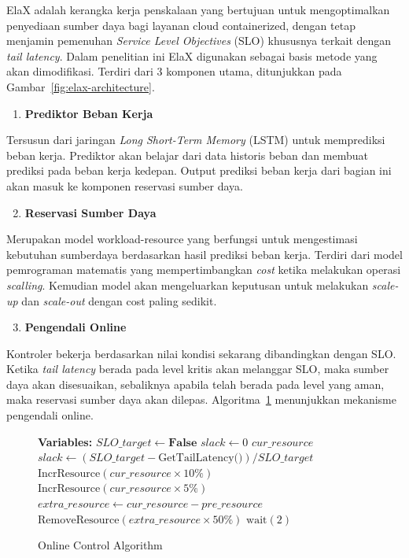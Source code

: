 ElaX adalah kerangka kerja penskalaan yang bertujuan untuk mengoptimalkan penyediaan sumber daya bagi layanan cloud containerized, dengan tetap menjamin pemenuhan \emph{Service Level Objectives} (SLO) khususnya terkait dengan \emph{tail latency}. Dalam penelitian ini ElaX digunakan sebagai basis metode yang akan dimodifikasi. Terdiri dari 3 komponen utama, ditunjukkan pada Gambar~\ref{fig:elax-architecture}.

\begin{enumerate}
    \item \textbf{Prediktor Beban Kerja}
\end{enumerate}

Tersusun dari jaringan \emph{Long Short-Term Memory} (LSTM) untuk memprediksi beban kerja. Prediktor akan belajar dari data historis beban dan membuat prediksi pada beban kerja kedepan. Output prediksi beban kerja dari bagian ini akan masuk ke komponen reservasi sumber daya.

\begin{enumerate}
    \setcounter{enumi}{1}
    \item \textbf{Reservasi Sumber Daya}
\end{enumerate}

Merupakan model workload-resource yang berfungsi untuk mengestimasi kebutuhan sumberdaya berdasarkan hasil prediksi beban kerja. Terdiri dari model pemrograman matematis yang mempertimbangkan \emph{cost} ketika melakukan operasi \emph{scalling}. Kemudian model akan mengeluarkan keputusan untuk melakukan \emph{scale-up} dan \emph{scale-out} dengan cost paling sedikit.

\begin{enumerate}
    \setcounter{enumi}{2}
    \item \textbf{Pengendali Online}
\end{enumerate}

Kontroler bekerja berdasarkan nilai kondisi sekarang dibandingkan dengan SLO. Ketika \emph{tail latency} berada pada level kritis akan melanggar SLO, maka sumber daya akan disesuaikan, sebaliknya apabila telah berada pada level yang aman, maka reservasi sumber daya akan dilepas. Algoritma~\ref{alg:online-control} menunjukkan mekanisme pengendali online.

\begin{figure}[htbp]
\caption{Online Control Algorithm}
\label{alg:online-control}
\begin{algorithmic}[1]
\State \textbf{Variables:}
\State \quad $SLO\_target \gets \textbf{False}$
\State \quad $slack \gets 0$
\State \quad $cur\_resource$
\Repeat
    \State $slack \gets (SLO\_target - \text{GetTailLatency()}) / SLO\_target$
        \State $\text{IncrResource}(cur\_resource \times 10\%)$
        \State $\text{IncrResource}(cur\_resource \times 5\%)$
    \Else
        \State $extra\_resource \gets cur\_resource - pre\_resource$
            \State $\text{RemoveResource}(extra\_resource \times 50\%)$
        \EndIf
    \EndIf
    \State $\text{wait}(2)$ 
\end{algorithmic}
\end{figure}


